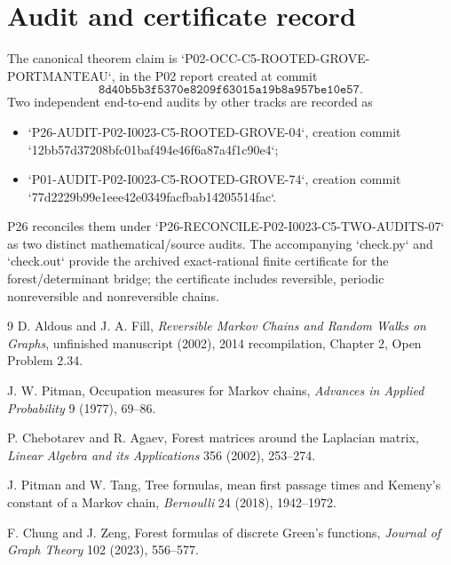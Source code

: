 \documentclass[11pt]{article}
\begin{document}
\section{Audit and certificate record}
The canonical theorem claim is `P02-OCC-C5-ROOTED-GROVE-PORTMANTEAU`, in the P02 report created at commit
\[
\texttt{8d40b5b3f5370e8209f63015a19b8a957be10e57}.
\]
Two independent end-to-end audits by other tracks are recorded as
\begin{itemize}
\item `P26-AUDIT-P02-I0023-C5-ROOTED-GROVE-04`, creation commit `12bb57d37208bfc01baf494e46f6a87a4f1c90e4`;
\item `P01-AUDIT-P02-I0023-C5-ROOTED-GROVE-74`, creation commit `77d2229b99e1eee42e0349facfbab14205514fac`.
\end{itemize}
P26 reconciles them under `P26-RECONCILE-P02-I0023-C5-TWO-AUDITS-07` as two distinct mathematical/source audits.  The accompanying `check.py` and `check.out` provide the archived exact-rational finite certificate for the forest/determinant bridge; the certificate includes reversible, periodic nonreversible and nonreversible chains.

\begin{thebibliography}{9}
D. Aldous and J. A. Fill,
\emph{Reversible Markov Chains and Random Walks on Graphs}, unfinished manuscript (2002), 2014 recompilation, Chapter 2, Open Problem 2.34.

J. W. Pitman,
Occupation measures for Markov chains,
\emph{Advances in Applied Probability} 9 (1977), 69--86.

P. Chebotarev and R. Agaev,
Forest matrices around the Laplacian matrix,
\emph{Linear Algebra and its Applications} 356 (2002), 253--274.

J. Pitman and W. Tang,
Tree formulas, mean first passage times and Kemeny's constant of a Markov chain,
\emph{Bernoulli} 24 (2018), 1942--1972.

F. Chung and J. Zeng,
Forest formulas of discrete Green's functions,
\emph{Journal of Graph Theory} 102 (2023), 556--577.
\end{thebibliography}
\end{document}

